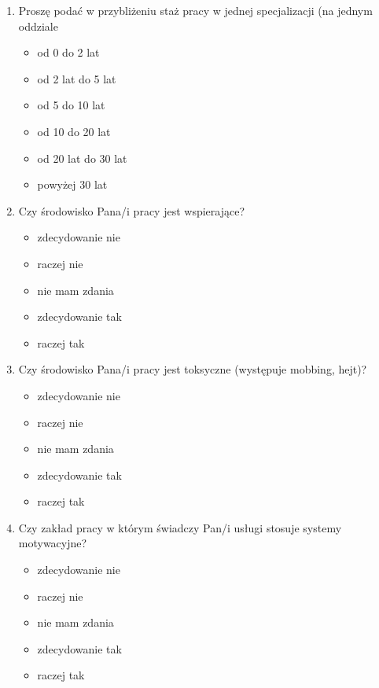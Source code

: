 \documentclass[a4paper,12pt,twoside,openright]{mwrep}
\begin{document}
\begin{enumerate}[label=\arabic*)]
		\item{Proszę podać w przybliżeniu staż pracy w jednej specjalizacji (na jednym oddziale}
		\begin{itemize}
			\item{od 0 do 2 lat}
			\item{od 2 lat do 5 lat}
			\item{od 5 do 10 lat}
			\item{od 10 do 20 lat}
			\item{od 20 lat do 30 lat}
			\item{powyżej 30 lat}
		\end{itemize}
		\vspace{\baselineskip} 
		
		
		\item{Czy środowisko Pana/i pracy jest wspierające?}
		\begin{itemize}
			\item{zdecydowanie nie}
			\item{raczej nie}
			\item{nie mam zdania}
			\item{zdecydowanie tak}
			\item{raczej tak}
		\end{itemize}
		\vspace{\baselineskip} 
		
		\item{Czy środowisko Pana/i pracy jest toksyczne (występuje mobbing, hejt)?}
		\begin{itemize}
			\item{zdecydowanie nie}
			\item{raczej nie}
			\item{nie mam zdania}
			\item{zdecydowanie tak}
			\item{raczej tak}
		\end{itemize}
		\vspace{\baselineskip} 
		
		
		\item{Czy zakład pracy w którym świadczy Pan/i usługi stosuje systemy motywacyjne?}
		\begin{itemize}
			\item{zdecydowanie nie}
			\item{raczej nie}
			\item{nie mam zdania}
			\item{zdecydowanie tak}
			\item{raczej tak}
		\end{itemize}
		\vspace{\baselineskip} 
		

\end{enumerate}
\end{document}
